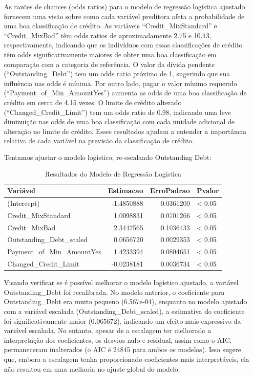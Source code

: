 \documentclass[
  letterpaper,
  DIV=11,
  numbers=noendperiod]{scrreprt}
\begin{document}
As razões de chances (odds ratios) para o modelo de regressão logística
ajustado fornecem uma visão sobre como cada variável preditora afeta a
probabilidade de uma boa classificação de crédito. As variáveis
``Credit\_MixStandard'' e ``Credit\_MixBad'' têm odds ratios de
aproximadamente 2.75 e 10.43, respectivamente, indicando que os
indivíduos com essas classificações de crédito têm odds
significativamente maiores de obter uma boa classificação em comparação
com a categoria de referência. O valor da dívida pendente
(``Outstanding\_Debt'') tem um odds ratio próximo de 1, sugerindo que
sua influência nas odds é mínima. Por outro lado, pagar o valor mínimo
requerido (``Payment\_of\_Min\_AmountYes'') aumenta as odds de uma boa
classificação de crédito em cerca de 4.15 vezes. O limite de crédito
alterado (``Changed\_Credit\_Limit'') tem um odds ratio de 0.98,
indicando uma leve diminuição nas odds de uma boa classificação com cada
unidade adicional de alteração no limite de crédito. Esses resultados
ajudam a entender a importância relativa de cada variável na previsão da
classificação de crédito.

Tentamos ajustar o modelo logistico, re-escalando Outstanding Debt:

\begin{longtable}[t]{lrrl}
\caption{\label{tab:unnamed-chunk-37}Resultados do Modelo de Regressão Logística}\\
\toprule
Variável & Estimacao & ErroPadrao & Pvalor\\
\midrule
(Intercept) & -1.4850888 & 0.0361200 & < 0.05\\
Credit\_MixStandard & 1.0098831 & 0.0701266 & < 0.05\\
Credit\_MixBad & 2.3447565 & 0.1036433 & < 0.05\\
Outstanding\_Debt\_scaled & 0.0656720 & 0.0029353 & < 0.05\\
Payment\_of\_Min\_AmountYes & 1.4233394 & 0.0804651 & < 0.05\\
\addlinespace
Changed\_Credit\_Limit & -0.0238181 & 0.0036734 & < 0.05\\
\bottomrule
\end{longtable}

Visando verificar se é possível melhorar o modelo logístico ajustado, a
variável Outstanding\_Debt foi recalibrada. No modelo anterior, o
coeficiente para Outstanding\_Debt era muito pequeno (6.567e-04),
enquanto no modelo ajustado com a variável escalada
(Outstanding\_Debt\_scaled), a estimativa do coeficiente foi
significativamente maior (0.065672), indicando um efeito mais expressivo
da variável escalada. No entanto, apesar de a escalagem ter melhorado a
interpretação dos coeficientes, os desvios nulo e residual, assim como o
AIC, permaneceram inalterados (o AIC é 24845 para ambos os modelos).
Isso sugere que, embora a escalagem tenha proporcionado coeficientes
mais interpretáveis, ela não resultou em uma melhoria no ajuste global
do modelo.
\end{document}
